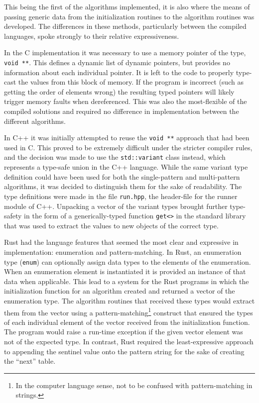 This being the first of the algorithms implemented, it is also where the means of passing generic data from the initialization routines to the algorithm routines was developed. The differences in these methods, particularly between the compiled languages, spoke strongly to their relative expressiveness.

In the C implementation it was necessary to use a memory pointer of the type, \texttt{void~**}. This defines a dynamic list of dynamic pointers, but provides no information about each individual pointer. It is left to the code to properly type-cast the values from this block of memory. If the program is incorrect (such as getting the order of elements wrong) the resulting typed pointers will likely trigger memory faults when dereferenced. This was also the most-flexible of the compiled solutions and required no difference in implementation between the different algorithms.

In C++ it was initially attempted to reuse the \texttt{void~**} approach that had been used in C. This proved to be extremely difficult under the stricter compiler rules, and the decision was made to use the \texttt{std::variant} class instead, which represents a type-safe union in the C++ language. While the same variant type definition could have been used for both the single-pattern and multi-pattern algorithms, it was decided to distinguish them for the sake of readability. The type definitions were made in the file \texttt{run.hpp}, the header-file for the runner module of C++. Unpacking a vector of the variant types brought further type-safety in the form of a generically-typed function \texttt{get<>} in the standard library that was used to extract the values to new objects of the correct type.

Rust had the language features that seemed the most clear and expressive in implementation: enumeration and pattern-matching. In Rust, an enumeration type (\texttt{enum}) can optionally assign data types to the elements of the enumeration. When an enumeration element is instantiated it is provided an instance of that data when applicable. This lead to a system for the Rust programs in which the initialization function for an algorithm created and returned a vector of the enumeration type. The algorithm routines that received these types would extract them from the vector using a pattern-matching\footnote{In the computer language sense, not to be confused with pattern-matching in strings.} construct that ensured the types of each individual element of the vector received from the initialization function. The program would raise a run-time exception if the given vector element was not of the expected type. In contrast, Rust required the least-expressive approach to appending the sentinel value onto the pattern string for the sake of creating the ``next'' table.


